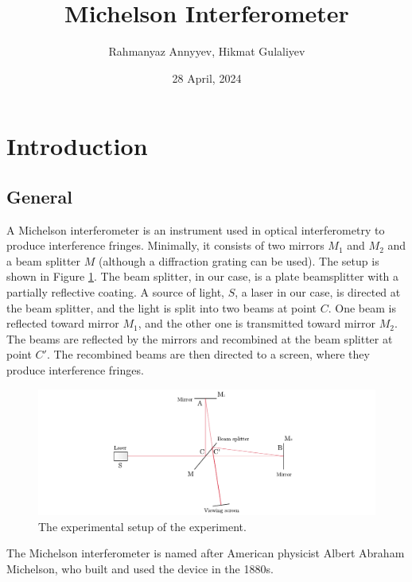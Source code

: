 \documentclass[10pt]{article}
\title{Michelson Interferometer}
\author{Rahmanyaz Annyyev, Hikmat Gulaliyev}
\date{28 April, 2024}
\begin{document}
\maketitle

\begin{abstract}
  
\end{abstract}

\section{Introduction}

\subsection*{General}

A Michelson interferometer is an instrument used in optical interferometry to produce interference fringes. Minimally, it consists of two mirrors $M_1$ and $M_2$ and a beam splitter $M$ (although a diffraction grating can be used). The setup is shown in Figure \ref{fig:1}. The beam splitter, in our case, is a plate beamsplitter with a partially reflective coating. A source of light, $S$, a laser in our case, is directed at the beam splitter, and the light is split into two beams at point $C$. One beam is reflected toward mirror $M_1$, and the other one is transmitted toward mirror $M_2$. The beams are reflected by the mirrors and recombined at the beam splitter at point $C'$. The recombined beams are then directed to a screen, where they produce interference fringes.

\begin{figure}[hbt!]
  \centering
  \includegraphics[scale=0.6]{figures/f1.pdf}
  \caption{The experimental setup of the experiment.}
  \label{fig:1}
\end{figure}





The Michelson interferometer is named after American physicist Albert Abraham Michelson, who built and used the device in the 1880s.
\end{document}
